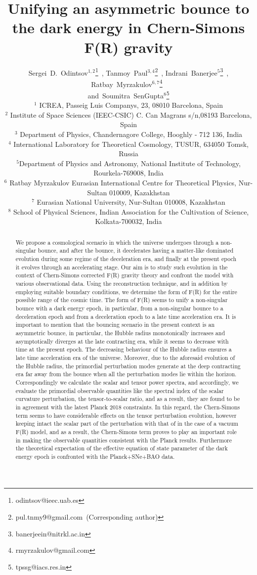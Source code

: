 \documentclass{article}
\title{Unifying an asymmetric bounce to the dark energy in Chern-Simons F(R) gravity}
\author{Sergei~D.~Odintsov$^{1,2}$\footnote{odintsov@ieec.uab.es}~,
Tanmoy~Paul$^{3,4}$\footnote{pul.tnmy9@gmail.com~(Corresponding author)}~,
Indrani~Banerjee$^{5}$\footnote{banerjeein@nitrkl.ac.in}~,
Ratbay~Myrzakulov$^{6,7}$\footnote{rmyrzakulov@gmail.com}~\\
and~Soumitra~SenGupta$^{8}$\footnote{tpssg@iacs.res.in} \\
\small{$^{1}$ ICREA, Passeig Luis Companys, 23, 08010 Barcelona, Spain}\\
\small{$^{2}$ Institute of Space Sciences (IEEC-CSIC) C. Can Magrans s/n,08193 Barcelona, Spain}\\
\small{$^{3}$ Department of Physics, Chandernagore College, Hooghly - 712 136, India}\\
\small{$^{4}$ International Laboratory for Theoretical Cosmology, TUSUR, 634050 Tomsk, Russia}\\
\small{$^{5}$Department of Physics and Astronomy, National Institute of Technology, Rourkela-769008, India }\\
\small{$^{6}$ Ratbay Myrzakulov Eurasian International Centre for Theoretical Physics, Nur-Sultan 010009, Kazakhstan}\\
\small{$^{7}$ Eurasian  National University, Nur-Sultan 010008, Kazakhstan}\\
\small{$^{8}$ School of Physical Sciences, Indian Association for the Cultivation of Science, Kolkata-700032, India}}
\date{ }  %
\begin{document}
  
\maketitle 
\begin{abstract}
We propose a cosmological scenario in which the universe undergoes through a non-singular bounce, and after the bounce, it decelerates 
having a matter-like dominated evolution during some regime of the deceleration era, and finally at the present epoch it evolves through 
an accelerating stage. Our aim is to study such evolution in the context of Chern-Simons corrected F(R) gravity theory and confront the model 
with various observational data. Using the reconstruction technique, and in addition by employing suitable boundary conditions, we determine 
the form of F(R) for the entire possible range of the cosmic time. The form of F(R) seems to unify a non-singular bounce with a dark energy epoch, in 
particular, from a non-singular bounce to a deceleration epoch and from a deceleration epoch to a late time acceleration era. It is important to mention 
that the bouncing scenario in the present context is an asymmetric bounce, in particular, the Hubble radius monotonically increases and asymptotically 
diverges at the late contracting era, while it seems to decrease with time at the present epoch. The decreasing behaviour of the Hubble radius ensures a 
late time acceleration era of the universe. Moreover, due to the aforesaid evolution of the Hubble radius, the primordial perturbation modes 
generate at the deep contracting era far away from the bounce when all the perturbation modes lie within the horizon. Correspondingly 
we calculate the scalar and tensor power spectra, and accordingly, we evaluate the primordial observable quantities like the spectral index of the 
scalar curvature perturbation, the tensor-to-scalar ratio, and as a result, they are found to be in agreement with the latest Planck 2018 constraints. 
In this regard, the Chern-Simons term seems to have considerable effects on the tensor perturbation evolution, 
however keeping intact the scalar part of the perturbation with that of in the case of a vacuum F(R) model, and as a result, the Chern-Simons term 
proves to play an important role in making the observable quantities consistent with the Planck results. Furthermore the theoretical expectation 
of the effective equation of state parameter of the dark energy epoch is confronted with the Planck+SNe+BAO data.


\end{abstract}
\end{document}
